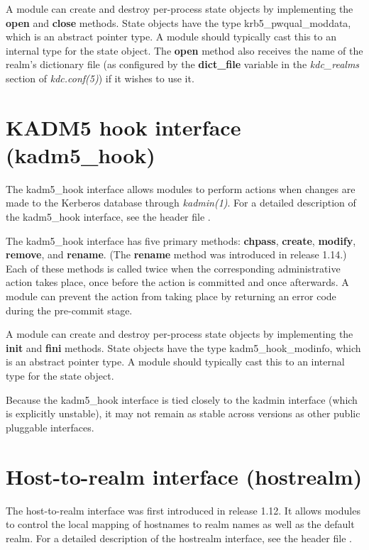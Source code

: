 \documentclass[letterpaper,10pt,english]{sphinxmanual}
\begin{document}
A module can create and destroy per-process state objects by
implementing the \textbf{open} and \textbf{close} methods.  State objects have
the type krb5\_pwqual\_moddata, which is an abstract pointer type.  A
module should typically cast this to an internal type for the state
object.  The \textbf{open} method also receives the name of the realm's
dictionary file (as configured by the \textbf{dict\_file} variable in the
\emph{kdc\_realms} section of \emph{kdc.conf(5)}) if it wishes to use
it.


\section{KADM5 hook interface (kadm5\_hook)}
\label{plugindev/kadm5_hook:kadm5-hook-interface-kadm5-hook}\label{plugindev/kadm5_hook::doc}\label{plugindev/kadm5_hook:kadm5-hook-plugin}
The kadm5\_hook interface allows modules to perform actions when
changes are made to the Kerberos database through \emph{kadmin(1)}.
For a detailed description of the kadm5\_hook interface, see the header
file .

The kadm5\_hook interface has five primary methods: \textbf{chpass},
\textbf{create}, \textbf{modify}, \textbf{remove}, and \textbf{rename}.  (The \textbf{rename}
method was introduced in release 1.14.)  Each of these methods is
called twice when the corresponding administrative action takes place,
once before the action is committed and once afterwards.  A module can
prevent the action from taking place by returning an error code during
the pre-commit stage.

A module can create and destroy per-process state objects by
implementing the \textbf{init} and \textbf{fini} methods.  State objects have
the type kadm5\_hook\_modinfo, which is an abstract pointer type.  A
module should typically cast this to an internal type for the state
object.

Because the kadm5\_hook interface is tied closely to the kadmin
interface (which is explicitly unstable), it may not remain as stable
across versions as other public pluggable interfaces.


\section{Host-to-realm interface (hostrealm)}
\label{plugindev/hostrealm:hostrealm-plugin}\label{plugindev/hostrealm::doc}\label{plugindev/hostrealm:host-to-realm-interface-hostrealm}
The host-to-realm interface was first introduced in release 1.12.  It
allows modules to control the local mapping of hostnames to realm
names as well as the default realm.  For a detailed description of the
hostrealm interface, see the header file
.
\end{document}
